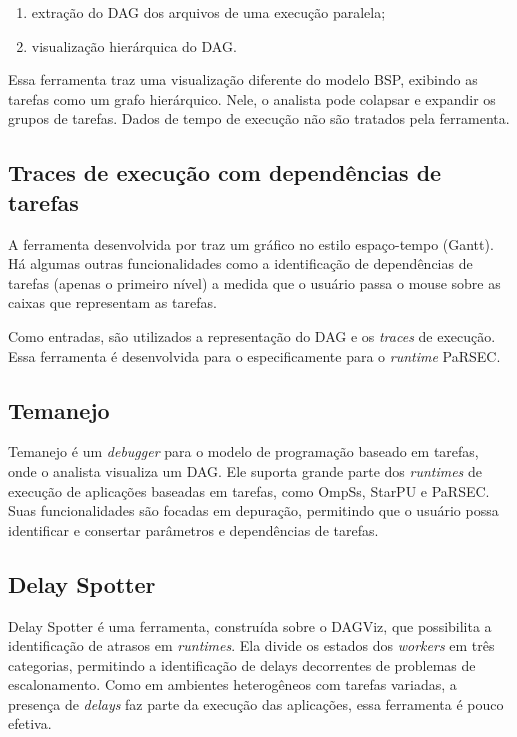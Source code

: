 \documentclass[ppgc,espec]{iiufrgs}
\begin{document}
\begin{enumerate}
    \item extração do DAG dos arquivos de uma execução paralela;
    \item visualização hierárquica do DAG.
\end{enumerate}

Essa ferramenta traz uma visualização diferente do modelo BSP, exibindo as tarefas como um grafo hierárquico. Nele, o analista pode colapsar e expandir os grupos de tarefas. Dados de tempo de execução não são tratados pela ferramenta.

\subsection{Traces de execução com dependências de tarefas}

A ferramenta desenvolvida por \citet{ref:visuexecdep} traz um gráfico no estilo espaço-tempo (Gantt). Há algumas outras funcionalidades como a identificação de dependências de tarefas (apenas o primeiro nível) a medida que o usuário passa o mouse sobre as caixas que representam as tarefas.

Como entradas, são utilizados a representação do DAG e os \emph{traces} de execução. Essa ferramenta é desenvolvida para o especificamente para o \emph{runtime} PaRSEC.

\subsection{Temanejo}

Temanejo \cite{ref:temanejo} é um \emph{debugger} para o modelo de programação baseado em tarefas, onde o analista visualiza um DAG. Ele suporta grande parte dos 
\emph{runtimes} de execução de aplicações baseadas em tarefas, como OmpSs, StarPU e PaRSEC. Suas funcionalidades são focadas em depuração, permitindo que o usuário possa identificar e consertar parâmetros e dependências de tarefas.

\subsection{Delay Spotter}

Delay Spotter \cite{ref:delayspotter} é uma ferramenta, construída sobre o DAGViz, que possibilita a identificação de atrasos em \emph{runtimes}.
Ela divide os estados dos \emph{workers} em três categorias, permitindo a identificação de delays decorrentes de problemas de escalonamento.
Como em ambientes heterogêneos com tarefas variadas, a presença de \emph{delays} faz parte da execução das aplicações, essa ferramenta é pouco efetiva.
\end{document}
